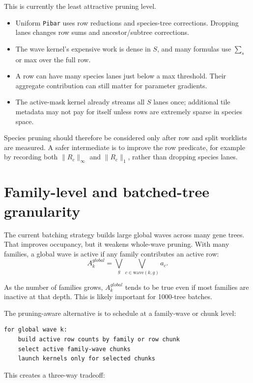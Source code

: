 \documentclass[11pt]{article}
\newcommand{\code}[1]{\texttt{#1}}
\begin{document}
This is currently the least attractive pruning level.

\begin{itemize}[leftmargin=*]
\item Uniform \code{Pibar} uses row reductions and species-tree corrections.
      Dropping lanes changes row sums and ancestor/subtree corrections.
\item The wave kernel's expensive work is dense in \(S\), and many formulas use
      \(\sum_s\) or max over the full row.
\item A row can have many species lanes just below a max threshold.  Their
      aggregate contribution can still matter for parameter gradients.
\item The active-mask kernel already streams all \(S\) lanes once; additional
      tile metadata may not pay for itself unless rows are extremely sparse in
      species space.
\end{itemize}

Species pruning should therefore be considered only after row and split
worklists are measured.  A safer intermediate is to improve the row predicate,
for example by recording both \(\|R_c\|_\infty\) and \(\|R_c\|_1\), rather than
dropping species lanes.

\section{Family-level and batched-tree granularity}

The current batching strategy builds large global waves across many gene trees.
That improves occupancy, but it weakens whole-wave pruning.  With many families,
a global wave is active if any family contributes an active row:
\[
  A_k^{global} =
  \bigvee_g \bigvee_{c \in \mathrm{wave}(k,g)} a_c.
\]

As the number of families grows, \(A_k^{global}\) tends to be true even if most
families are inactive at that depth.  This is likely important for 1000-tree
batches.

The pruning-aware alternative is to schedule at a family-wave or chunk level:

\begin{lstlisting}
for global wave k:
    build active row counts by family or row chunk
    select active family-wave chunks
    launch kernels only for selected chunks
\end{lstlisting}

This creates a three-way tradeoff:
\end{document}
